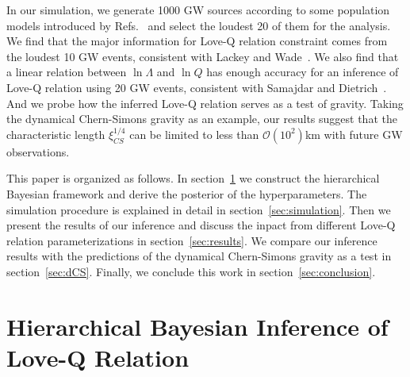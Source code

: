 \documentclass[a4paper,11pt]{article}
\begin{document}
In our simulation, we generate 1000 GW sources according to some population models introduced by Refs.~\cite{Fishbach:2018edt,Farrow:2019xnc,Samajdar:2020xrd} and select the loudest 20 of them for the analysis. We find that the major information for Love-Q relation constraint comes from the loudest 10 GW events, consistent with Lackey and Wade~\cite{Lackey:2014fwa}. We also find that a linear relation between $\ln\Lambda$ and $\ln Q$ has enough accuracy for an inference of Love-Q relation using 20 GW events, consistent with Samajdar and Dietrich~\cite{Samajdar:2020xrd}. And we probe how the inferred Love-Q relation serves as a test of gravity. Taking the dynamical Chern-Simons gravity as an example, our results suggest that the characteristic length $\xi_{CS}^{1/4}$ can be limited to less than $\mathcal{O}(10^2)$km with future GW observations. 

This paper is organized as follows. In section~\ref{sec:framework} we construct the hierarchical Bayesian framework and derive the posterior of the hyperparameters. The simulation procedure is explained in detail in section~\ref{sec:simulation}. Then we present the results of our inference and discuss the inpact from different Love-Q relation parameterizations in section~\ref{sec:results}. We compare our inference results with the predictions of the dynamical Chern-Simons gravity as a test in section~\ref{sec:dCS}. Finally, we conclude this work in section~\ref{sec:conclusion}.


\section{Hierarchical Bayesian Inference of Love-Q Relation}
\label{sec:framework}

\end{document}

